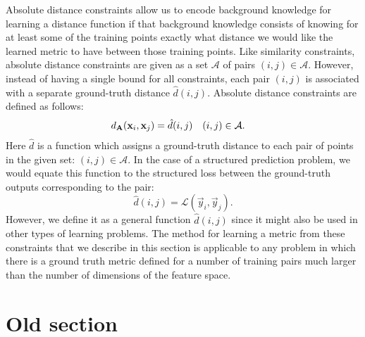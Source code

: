 Absolute distance constraints allow us to encode background knowledge for learning a distance function if that background knowledge consists of knowing for at least some of the training points exactly what distance we would like the learned metric to have between those training points. Like similarity constraints, absolute distance constraints are given as a set $\mathcal{A}$ of pairs $(i,j) \in \mathcal{A}$. However, instead of having a single bound for all constraints, each pair $(i,j)$ is associated with a separate ground-truth distance $\hat{d}(i,j)$. Absolute distance constraints are defined as follows: 
\begin{align}
d_{\mathbf{A}}(\mathbf{x}_i, \mathbf{x}_j) &= \hat{d}(i,j) & (i, j) &\in \mathcal{A}.
\end{align}
Here $\hat{d}$ is a function which assigns a ground-truth distance to each pair of points in the given set: $(i,j) \in \mathcal{A}$. In the case of a structured prediction problem, we would equate this function to the structured loss between the ground-truth outputs corresponding to the pair:
\begin{equation}
\hat{d}(i,j) = \mathcal{L}(\vec{y}_i, \vec{y}_j).
\end{equation}
However, we define it as a general function $\hat{d}(i,j)$ since it might also be used in other types of learning problems. The method for learning a metric from these constraints that we describe in this section is applicable to any problem in which there is a ground truth metric defined for a number of training pairs much larger than the number of dimensions of the feature space.






\section*{Old section}


